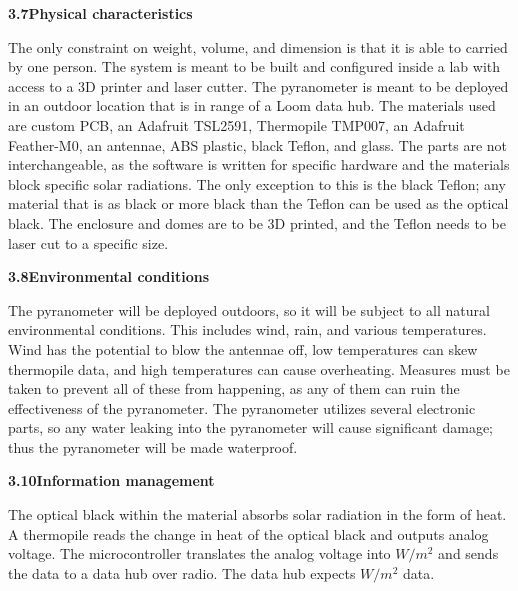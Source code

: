 \documentclass[10pt,draftclsnofoot,onecolumn,letterpaper]{article}
\begin{document}
{\fontsize{10pt}{12.0pt} \textbf{3.7\quad Physical characteristics}\\\selectfont 
\par}\par
{\fontsize{10pt}{12.0pt} The only constraint on weight, volume, and dimension is that it is able to carried by one person. The system is meant to be built and configured inside a lab with access to a 3D printer and laser cutter. The pyranometer is meant to be deployed in an outdoor location that is in range of a Loom data hub. The materials used are custom PCB, an Adafruit TSL2591, Thermopile TMP007, an Adafruit Feather-M0, an antennae, ABS plastic, black Teflon, and glass. The parts are not interchangeable, as the software is written for specific hardware and the materials block specific solar radiations. The only exception to this is the black Teflon; any material that is as black or more black than the Teflon can be used as the optical black. The enclosure and domes are to be 3D printed, and the Teflon needs to be laser cut to a specific size. \\\selectfont 
\par}\par

{\fontsize{10pt}{12.0pt} \textbf{3.8\quad Environmental conditions}\\\selectfont 
\par}\par
{\fontsize{10pt}{12.0pt}The pyranometer will be deployed outdoors, so it will be subject to all natural environmental conditions. This includes wind, rain, and various temperatures. Wind has the potential to blow the antennae off, low temperatures can skew thermopile data, and high temperatures can cause overheating. Measures must be taken to prevent all of these from happening, as any of them can ruin the effectiveness of the pyranometer. The pyranometer utilizes several electronic parts, so any water leaking into the pyranometer will cause significant damage; thus the pyranometer will be made waterproof. \\\selectfont 
\par}\par

{\fontsize{10pt}{12.0pt} \textbf{3.10\quad Information management}\\\selectfont 
\par}\par
{\fontsize{10pt}{12.0pt} The optical black within the material absorbs solar radiation in the form of heat. A thermopile reads the change in heat of the optical black and outputs analog voltage. The microcontroller translates the analog voltage into $W/m^2$ and sends the data to a data hub over radio. The data hub expects $W/m^2$ data.\\\selectfont 
\par}\par
\end{document}
